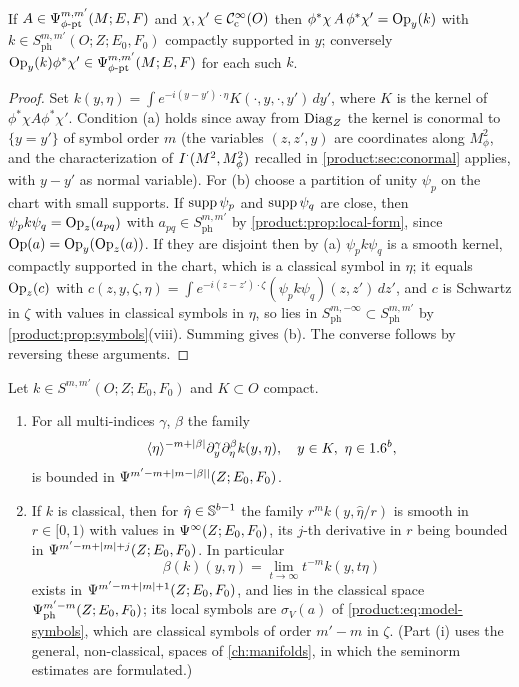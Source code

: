 \begin{proposition}\label{product:prop:operator-valued}
If $A\in\Psi^{m,m'}_{\phi\text{-}\mathrm{pt}}(M;E,F)$ and $\chi,\chi'\in\mathcal{C}^\infty_{\mathrm{c}}(O)$ then
$\phi^*\chi\,A\,\phi^*\chi'=\operatorname{Op}_y(k)$ with $k\in S^{m,m'}_{\mathrm{ph}}(O;Z;E_0,F_0)$
compactly supported in $y$; conversely $\operatorname{Op}_y(k)\phi^*\chi'\in\Psi^{m,m'}_{\phi\text{-}\mathrm{pt}}(M;E,F)$
for each such $k$.
\end{proposition}

\begin{proof}
Set $k(y,\eta)=\int e^{-i(y-y')\cdot\eta}K(\cdot,y,\cdot,y')\,dy'$, where $K$ is the
kernel of $\phi^*\chi A\phi^*\chi'$. Condition (a) holds since away from $\operatorname{Diag}_Z$
the kernel is conormal to $\{y=y'\}$ of symbol order $m$ (the variables
$(z,z',y)$ are coordinates along $M^2_\phi$, and the characterization of
$I^{\cdot}(M^2,M^2_\phi)$ recalled in \cref{product:sec:conormal} applies, with
$y-y'$ as normal variable). For (b) choose a partition of unity $\psi_p$ on the
chart with small supports. If $\operatorname{supp}\psi_p$ and $\operatorname{supp}\psi_q$ are close, then
$\psi_pk\psi_q=\operatorname{Op}_z(a_{pq})$ with $a_{pq}\in S^{m,m'}_{\mathrm{ph}}$ by
\cref{product:prop:local-form}, since $\operatorname{Op}(a)=\operatorname{Op}_y(\operatorname{Op}_z(a))$. If they are
disjoint then by (a) $\psi_pk\psi_q$ is a smooth kernel, compactly supported in
the chart, which is a classical symbol in $\eta$; it equals $\operatorname{Op}_z(c)$ with
$c(z,y,\zeta,\eta)=\int e^{-i(z-z')\cdot\zeta}(\psi_pk\psi_q)(z,z')\,dz'$, and $c$ is
Schwartz in $\zeta$ with values in classical symbols in $\eta$, so lies in
$S^{m,-\infty}_{\mathrm{ph}}\subset S^{m,m'}_{\mathrm{ph}}$ by
\cref{product:prop:symbols}(viii). Summing gives (b). The converse follows by
reversing these arguments.
\end{proof}

\begin{lemma}\label{product:lem:fibre-bounds}
Let $k\in S^{m,m'}(O;Z;E_0,F_0)$ and $K\subset O$ compact.
\begin{enumerate}[label=\textup{(\roman*)}]
\item For all multi-indices $\gamma$, $\beta$ the family
\begin{equation*}
\langle \eta\rangle^{-m+|\beta|}\partial_y^\gamma\partial_\eta^\beta k(y,\eta),\quad y\in K,\ \eta\in1.6^b,
\end{equation*}
is bounded in $\Psi^{m'-m+|m-|\beta||}(Z;E_0,F_0)$.
\item If $k$ is classical, then for $\hat\eta\in\mathbb{S}^{b-1}$ the family
$r^mk(y,\hat\eta/r)$ is smooth in $r\in[0,1)$ with values in
$\Psi^{\infty}(Z;E_0,F_0)$, its $j$-th derivative in $r$ being bounded in
$\Psi^{m'-m+|m|+j}(Z;E_0,F_0)$. In particular
\begin{equation}\label{product:eq:base-limit}
\beta(k)(y,\eta)=\lim_{t\to\infty}t^{-m}k(y,t\eta)
\end{equation}
exists in $\Psi^{m'-m+|m|+1}(Z;E_0,F_0)$, and lies in the classical space
$\Psi^{m'-m}_{\mathrm{ph}}(Z;E_0,F_0)$; its local symbols are $\sigma_V(a)$ of
\eqref{product:eq:model-symbols}, which are classical symbols of order $m'-m$ in
$\zeta$. (Part \textup{(i)} uses the general, non-classical, spaces of
\cref{ch:manifolds}, in which the seminorm estimates are formulated.)
\end{enumerate}
\end{lemma}

